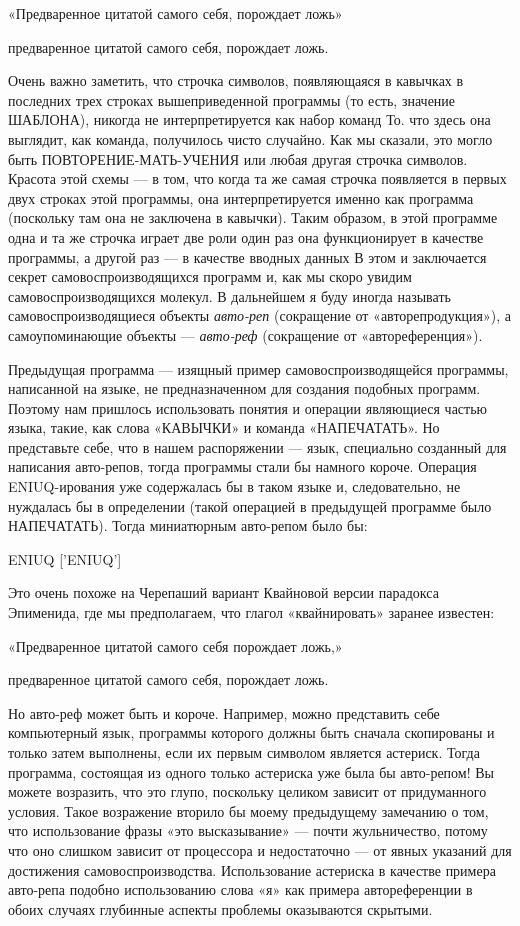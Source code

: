 \documentclass[../main.tex]{subfiles}
\begin{document}
«Предваренное цитатой самого себя, порождает ложь»

предваренное цитатой самого себя, порождает ложь.

Очень важно заметить, что строчка символов, появляющаяся в кавычках в последних трех строках вышеприведенной программы (то есть, значение ШАБЛОНА), никогда не интерпретируется как набор команд То. что здесь она выглядит, как команда, получилось чисто случайно. Как мы сказали, это могло быть ПОВТОРЕНИЕ-МАТЬ-УЧЕНИЯ или любая другая строчка символов. Красота этой схемы --- в том, что когда та же самая строчка появляется в первых двух строках этой программы, она интерпретируется именно как программа (поскольку там она не заключена в кавычки). Таким образом, в этой программе одна и та же строчка играет две роли один раз она функционирует в качестве программы, а другой раз --- в качестве вводных данных В этом и заключается секрет самовоспроизводящихся программ и, как мы скоро увидим самовоспроизводящихся молекул. В дальнейшем я буду иногда называть самовоспроизводящиеся объекты \emph{авто-реп} (сокращение от «авторепродукция»), а самоупоминающие объекты --- \emph{авто-реф} (сокращение от «автореференция»).

Предыдущая программа --- изящный пример самовоспроизводящейся программы, написанной на языке, не предназначенном для создания подобных программ. Поэтому нам пришлось использовать понятия и операции являющиеся частью языка, такие, как слова «КАВЫЧКИ» и команда «НАПЕЧАТАТЬ». Но представьте себе, что в нашем распоряжении --- язык, специально созданный для написания авто-репов, тогда программы стали бы намного короче. Операция ENIUQ-ирования уже содержалась бы в таком языке и, следовательно, не нуждалась бы в определении (такой операцией в предыдущей программе было НАПЕЧАТАТЬ). Тогда миниатюрным авто-репом было бы:

ENIUQ {[}'ENIUQ'{]}

Это очень похоже на Черепаший вариант Квайновой версии парадокса Эпименида, где мы предполагаем, что глагол «квайнировать» заранее известен:

«Предваренное цитатой самого себя порождает ложь,»

предваренное цитатой самого себя, порождает ложь.

Но авто-реф может быть и короче. Например, можно представить себе компьютерный язык, программы которого должны быть сначала скопированы и только затем выполнены, если их первым символом является астериск. Тогда программа, состоящая из одного только астериска уже была бы авто-репом! Вы можете возразить, что это глупо, поскольку целиком зависит от придуманного условия. Такое возражение вторило бы моему предыдущему замечанию о том, что использование фразы «это высказывание» --- почти жульничество, потому что оно слишком зависит от процессора и недостаточно --- от явных указаний для достижения самовоспроизводства. Использование астериска в качестве примера авто-репа подобно использованию слова «я» как примера автореференции в обоих случаях глубинные аспекты проблемы оказываются скрытыми.
\end{document}
